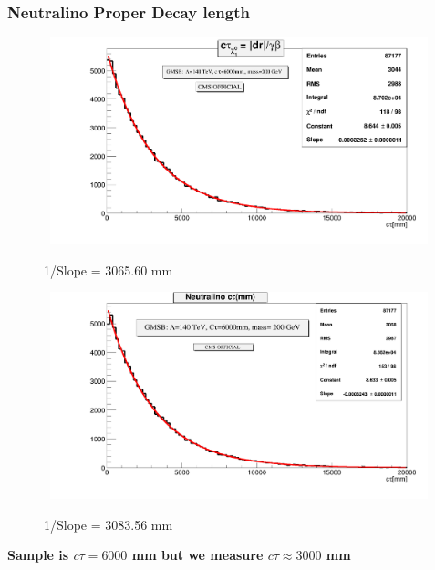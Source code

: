 \documentclass{beamer}
\begin{document}
\begin{frame}
    \frametitle{ Neutralino Proper Decay length}
    \begin{figure}[ht]
    \begin{minipage}[b]{0.45\linewidth}
    \centering
     \mbox{
    \includegraphics[height=6cm,width=\textwidth]{Dist_TravDL.png}}
    \vspace{-1cm}
     \caption{1/Slope = 3065.60 mm }
     \label{fig:Neutralino Distance}    
    \end{minipage}
    \hspace{0.1cm}
    \begin{minipage}[b]{0.45\linewidth}
    \centering
    \mbox{
    \includegraphics[height=6cm, width=\textwidth]{MC_TimeDL.png}}
     \vspace{-1cm}
    \caption{1/Slope = 3083.56 mm }
    \label{fig:From_MC}
     \end{minipage}
\end{figure}
\vspace{-1cm}
\alert{\textbf{Sample is $c\tau= 6000$ mm but we measure $c\tau \approx 3000$ mm}}

   
\end{frame}
\end{document}
